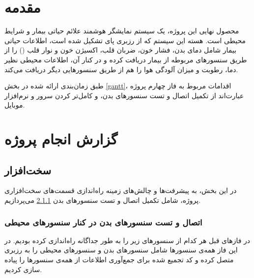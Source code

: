 \documentclass[12pt]{article}
\begin{document}
\newpage
\pagestyle{fancy}
\fancyhf{}
\fancyfoot{}
\cfoot{\thepage}
\chead{}

\newfontfamily{}

\KashidaOff
 \newcommand{\inlineLatin}[1]{
	\small{\lr{{\terminal #1}}}
}


\tableofcontents
\listoffigures

\newpage
\section{مقدمه}


محصول نهایی این پروژه، یک سیستم نمایشگر هوشمند علائم حیاتی بیمار و شرایط محیطی است. هسته این سیستم که از رزبری پای تشکیل شده است، اطلاعات حیاتی بیمار شامل دمای بدن، فشار خون، ضربان قلب، اکسیژن خون و نوار قلب () را از طریق سنسور‌های مربوطه از بیمار دریافت کرده و در کنار آن، اطلاعات محیطی نظیر دما،‌ رطوبت و میزان آلودگی هوا را هم از طریق سنسورهایی دیگر دریافت می‌کند.

طبق زمان‌بندی ارائه شده در بخش \ref{gantt}، اقدامات مربوط به فاز چهارم پروژه عبارت‌اند از تکمیل اتصال و تست سنسورهای بدن، و کامل‌تر کردن سرور و نرم‌افزار موبایل. 


\section{گزارش انجام پروژه}
\subsection{سخت‌افزار}

در این بخش، به پیشرفت‌ها و چالش‌های زمینه راه‌اندازی قسمت‌های سخت‌افزاری پروژه، شامل تکمیل اتصال و تست سنسورهای بدن \ref{body} می‌پردازیم.

\subsubsection{ اتصال و تست سنسورهای بدن در کنار سنسورهای محیطی} \label{body}

در فازهای قبل هر کدام از سنسورهای زیر را به طور جداگانه راه‌اندازی کرده بودیم. در این فاز همه‌ی سنسورها شامل سنسورهای بدن و سنسورهای محیطی را به رزبری متصل کرده و کد تجمیع شده برای جمع‌آوری اطلاعات از همه‌ی سنسورها را پیاده سازی کردیم.
\end{document}
